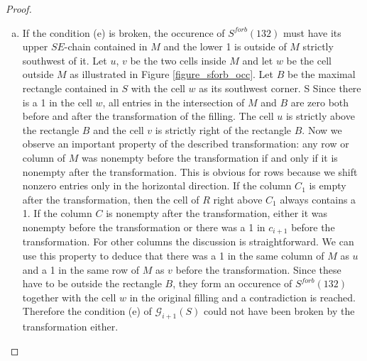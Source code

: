 \begin{proof}
\begin{enumerate}[(a)]
\item If the condition (e) is broken, the occurence of $S^{forb}(132)$ must have its upper $SE$-chain contained in $M$ and the lower 1
is outside of $M$ strictly southwest of it. Let $u$, $v$ be the two cells inside $M$ and let $w$ be the cell outside $M$ as illustrated
in Figure \ref{figure_sforb_occ}. Let $B$ be the maximal rectangle contained in $S$ with the cell $w$ as its southwest corner. S
Since there is a 1 in the cell $w$, all entries in the intersection of $M$ and $B$ are zero both before and after the transformation of the filling.
The cell $u$ is strictly above the rectangle $B$ and the cell $v$ is strictly right of the rectangle $B$. Now we observe an important property
of the described transformation: any row or column of $M$ was nonempty before the transformation if and only if it is nonempty after the transformation.
This is obvious for rows because we shift nonzero entries only in the horizontal direction. If the column $C_1$ is empty after the transformation,
then the cell of $R$ right above $C_1$ always contains a 1. If the column $C$ is nonempty after the transformation, either it was nonempty
before the transformation or there was a 1 in $c_{i+1}$ before the transformation. For other columns the discussion is straightforward.
We can use this property to deduce that there was a 1 in the same column of $M$ as $u$ and a 1 in the same row of $M$ as $v$ before the transformation.
Since these have to be outside the rectangle $B$, they form an occurence of $S^{forb}(132)$ together with the cell $w$ in the original filling
and a contradiction is reached. Therefore the condition (e) of $\mathcal{G}_{i+1}(S)$ could not have been broken by the transformation either.


\end{enumerate}
\end{proof}
